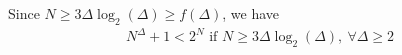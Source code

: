 \documentclass[12pt]{article}
\newcommand{\ParTh}[1]{\left(#1\right)}
\begin{document}
Since $N\geq3\Delta\log_2\ParTh{\Delta}\geq f\ParTh{\Delta}$, we have
\begin{align}
N^\Delta+1<2^N\text{ if }N\geq3\Delta\log_2\ParTh{\Delta},~\forall\Delta\geq2
\end{align}

\end{document}
